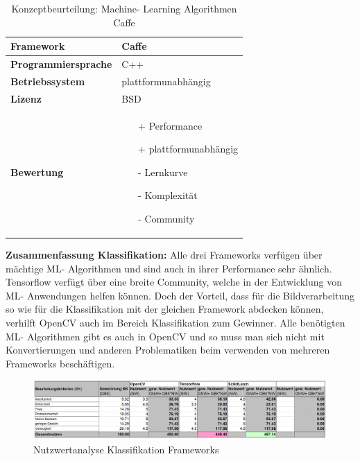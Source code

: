 \documentclass[../../main.tex]{subfiles}
\begin{document}
        \begin{flushleft}
            \begin{table}[h]
            \begin{tabular}{ | l | p{11cm} |}
            \hline
            \textbf{Framework} & Caffe \\ \hline
            \textbf{Programmiersprache} & C++ \\ \hline
            \textbf{Betriebssystem} & plattformunabhängig \\ \hline
            \textbf{Lizenz} & BSD \\ \hline
            \textbf{Bewertung} &  \begin{itemize}
                                    \item[+] Performance
                                    \item[+] plattformunabhängig 
                                    \item[-] Lernkurve
                                    \item[-] Komplexität 
                                    \item[-] Community 
                                  \end{itemize} \\ \hline
            \end{tabular}
            \caption{Konzeptbeurteilung: Machine- Learning Algorithmen Caffe}
            \label{tab:konzept_ML_Caffe}
            \end{table}
        \end{flushleft}

        \vspace{1cm}

        \textbf{Zusammenfassung Klassifikation: }
        Alle drei Frameworks verfügen über mächtige ML- Algorithmen und sind auch in ihrer Performance sehr ähnlich. Tensorflow verfügt über eine breite Community, welche in der Entwicklung von ML- Anwendungen helfen können. Doch der Vorteil, dass für die Bildverarbeitung so wie für die Klassifikation mit der gleichen Framework abdecken können, verhilft OpenCV auch im Bereich Klassifikation zum Gewinner. Alle benötigten ML- Algorithmen gibt es auch in OpenCV und so muss man sich nicht mit Konvertierungen und anderen Problematiken beim verwenden von mehreren Frameworks beschäftigen.


        \begin{figure}[H] 
            \centering
            \includegraphics[width=1\textwidth]{Nutzwert_machineLearning.png}
            \caption{Nutzwertanalyse Klassifikation Frameworks}
            \label{fig:ML_nutzwert}
        \end{figure}



        
    
    
    
    
    
\end{document}
